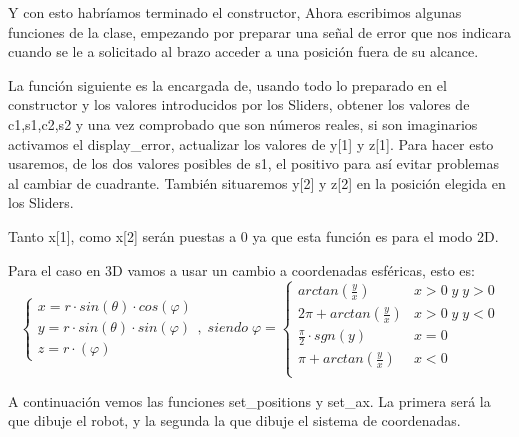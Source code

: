 

Y con esto habríamos terminado el constructor, Ahora escribimos algunas funciones de la clase, empezando por preparar una señal de error que nos indicara cuando se le a solicitado al brazo acceder a una posición fuera de su alcance.



La función siguiente es la encargada de, usando todo lo preparado en el constructor y los valores introducidos por los Sliders, obtener los valores de c1,s1,c2,s2 y una vez comprobado que son números reales, si son imaginarios activamos el display\_error, actualizar los valores de y[1] y z[1]. Para hacer esto usaremos, de los dos valores posibles de s1, el positivo para así evitar problemas al cambiar de cuadrante.
También situaremos y[2] y z[2] en la posición elegida en los Sliders.

Tanto x[1], como x[2] serán puestas a 0 ya que esta función es para el modo 2D.



Para el caso en 3D vamos a usar un cambio a coordenadas esféricas, esto es:
\[
\left \{
\begin{array}{lll}
x = r\cdot sin(\theta)\cdot cos(\varphi)\\
y = r\cdot sin(\theta)\cdot sin(\varphi)\\
z = r\cdot(\varphi)
\end{array}
\right .
\left .
,\;siendo\; \varphi
\right .
=
\left \{
\begin{array}{lll}
arctan\left(\frac{y}{x}\right) 			& x>0\; y\; y>0\\
2\pi + arctan\left(\frac{y}{x}\right)	& x>0\; y\; y<0\\
\frac{\pi}{2}\cdot sgn(y)						& x=0\\
\pi + arctan\left(\frac{y}{x}\right) 	& x<0\\
\end{array}
\right .
\]




A continuación vemos las funciones set\_positions y set\_ax.
La primera será la que dibuje el robot, y la segunda la que dibuje el sistema de coordenadas.




